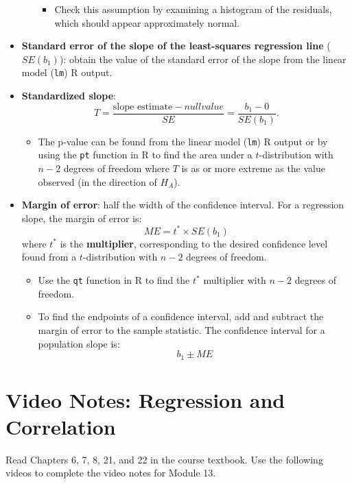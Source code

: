 \documentclass[
]{report}
\providecommand{\tightlist}{%
  \setlength{\itemsep}{0pt}\setlength{\parskip}{0pt}}
\begin{document}
\begin{itemize}
\begin{itemize}
    \begin{itemize}
    \tightlist
    \item
      Check this assumption by examining a histogram of the residuals, which should appear approximately normal.
    \end{itemize}
  \end{itemize}
\item
  \textbf{Standard error of the slope of the least-squares regression line} (\(SE(b_1)\)): obtain the value of the standard error of the slope from the linear model (\texttt{lm}) R output.
\item
  \textbf{Standardized slope}:
  \[
  T = \frac{\mbox{slope estimate}-null value}{SE} = \frac{b_1-0}{SE(b_1)}.
  \]

  \begin{itemize}
  \tightlist
  \item
    The p-value can be found from the linear model (\texttt{lm}) R output or by using the \texttt{pt} function in R to find the area under a \(t\)-distribution with \(n-2\) degrees of freedom where \(T\) is as or more extreme as the value observed (in the direction of \(H_A\)).
  \end{itemize}
\item
  \textbf{Margin of error}: half the width of the confidence interval. For a regression slope, the margin of error is:
  \[ME = t^* \times SE(b_1)\]
  where \(t^*\) is the \textbf{multiplier}, corresponding to the desired confidence level found from a \(t\)-distribution with \(n-2\) degrees of freedom.

  \begin{itemize}
  \item
    Use the \texttt{qt} function in R to find the \(t^*\) multiplier with \(n-2\) degrees of freedom.
  \item
    To find the endpoints of a confidence interval, add and subtract the margin of error to the sample statistic. The confidence interval for a population slope is:
    \[b_1 \pm ME\]
  \end{itemize}
\end{itemize}

\newpage

\section{Video Notes: Regression and Correlation}\label{video-notes-regression-and-correlation}

Read Chapters 6, 7, 8, 21, and 22 in the course textbook. Use the following videos to complete the video notes for Module 13.
\end{document}
